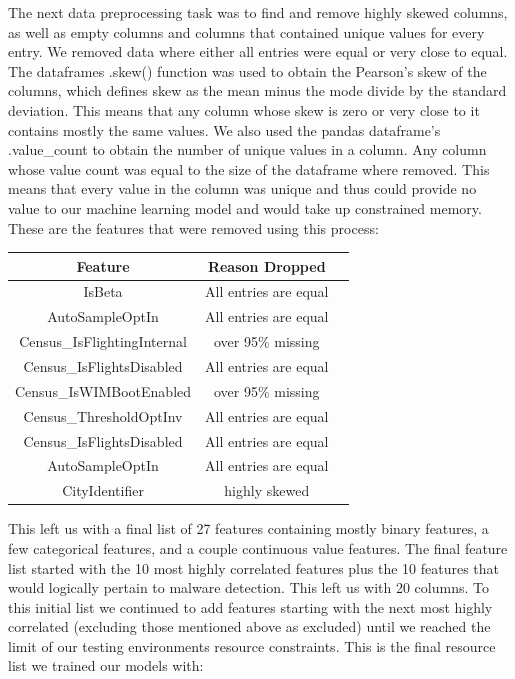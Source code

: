 \documentclass[sigconf]{acmart}
\begin{document}
The next data preprocessing task was to find and remove highly skewed columns, as well as empty columns and columns that contained unique values for every entry. We removed data where either all entries were equal or very close to equal. The dataframes .skew() function was used to obtain the Pearson's skew of the columns, which defines skew as the mean minus the mode divide by the standard deviation. This means that any column whose skew is zero or very close to it contains mostly the same values. We also used the pandas dataframe's .value\_count to obtain the number of unique values in a column. Any column whose value count was equal to the size of the dataframe where removed. This means that every value in the column was unique and thus could provide no value to our machine learning model and would take up constrained memory. These are the features that were removed using this process:

\begin{center}
\begin{tabular}{ |c|c|c| } 
 \hline
 Feature & Reason Dropped \\
 \hline\hline
IsBeta & All entries are equal \\
AutoSampleOptIn & All entries are equal \\
Census\_IsFlightingInternal & over 95\% missing \\
Census\_IsFlightsDisabled & All entries are equal \\
Census\_IsWIMBootEnabled & over 95\% missing \\
Census\_ThresholdOptInv & All entries are equal \\
Census\_IsFlightsDisabled & All entries are equal \\
AutoSampleOptIn & All entries are equal \\
CityIdentifier & highly skewed \\ 
 \hline
\end{tabular}
\end{center}
\vspace{3mm}

This left us with a final list of 27 features containing mostly binary features, a few categorical features, and a couple continuous value features. The final feature list started with the 10 most highly correlated features plus the 10 features that would logically pertain to malware detection. This left us with 20 columns. To this initial list we continued to add features starting with the next most highly correlated (excluding those mentioned above as excluded) until we reached the limit of our testing environments resource constraints. This is the final resource list we trained our models with:
\end{document}
